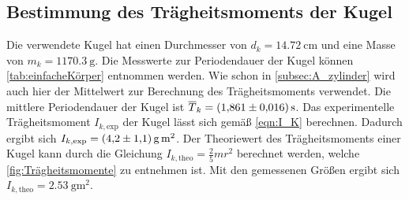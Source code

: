 \subsection{Bestimmung des Trägheitsmoments der Kugel}
\label{subsec:A_kugel}
Die verwendete Kugel hat einen Durchmesser von $d_k = \qty{14.72}{\centi\metre}$ und eine Masse von $m_k = \qty{1170.3}{\gram}$. Die Messwerte zur Periodendauer der Kugel
können \autoref{tab:einfacheKörper} entnommen werden. Wie schon in \autoref{subsec:A_zylinder} wird auch hier der Mittelwert zur Berechnung des Trägheitsmoments
verwendet. Die mittlere Periodendauer der Kugel ist $\overline{T}_k = \qty{1.861+-0.016}{\second}$. Das experimentelle Trägheitsmoment $I_{k,\text{exp}}$ der Kugel 
lässt sich gemäß \autoref{eqn:I_K} berechnen. Dadurch ergibt sich $I_{k,\text{exp}} = \qty{4.2+-1.1}{\gram\metre\squared}$. Der Theoriewert des Trägheitsmoments einer Kugel
kann durch die Gleichung $I_{k,\text{theo}} = \frac{2}{5}mr^2$ berechnet werden, welche \autoref{fig:Trägheitsmomente} zu entnehmen ist.
Mit den gemessenen Größen ergibt sich $I_{k,\text{theo}} = \qty{2.53}{\gram\metre\squared}$. 


